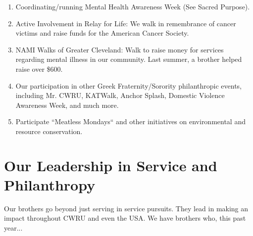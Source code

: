       \begin{enumerate}
      	\item Coordinating/running Mental Health Awareness Week (See Sacred Purpose).      	
      	\item Active Involvement in Relay for Life: We walk in remembrance of cancer victims and raise funds for the American Cancer Society.      	
      	\item NAMI Walks of Greater Cleveland: Walk to raise money for services regarding mental illness in our community. Last summer, a brother helped raise over \$600.
      	\item Our participation in other Greek Fraternity/Sorority philanthropic events, including Mr. CWRU, KATWalk, Anchor Splash, Domestic Violence Awareness Week, and much more.      	
      	\item Participate ``Meatless Mondays`` and other initiatives on environmental and resource conservation.
      \end{enumerate}
      
    \section*{Our Leadership in Service and Philanthropy}
      Our brothers go beyond just serving in service pursuits. They lead in making an impact throughout CWRU and even the USA. We have brothers who, this past year...
      

